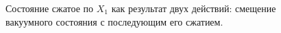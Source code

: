 \begin{figure}
\centering



\caption{Состояние сжатое по $X_1$ как результат двух действий:
  смещение вакуумного состояния с последующим его сжатием.}
\label{figPart3Squeezed_7}
\end{figure}
